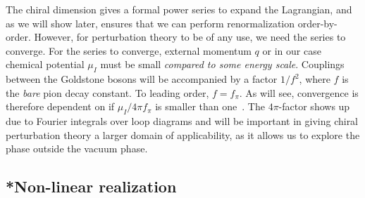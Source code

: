 The chiral dimension gives a formal power series to expand the Lagrangian, and as we will show later, ensures that we can perform renormalization order-by-order.
However, for perturbation theory to be of any use, we need the series to converge.
For the series to converge, external momentum $q$ or in our case chemical potential $\mu_I$ must be small \emph{compared to some energy scale}.
Couplings between the Goldstone bosons will be accompanied by a factor $1/f^2$, where $f$ is the \emph{bare} pion decay constant.
To leading order, $f = f_\pi$.
As will see, convergence is therefore dependent on if $\mu_I / 4 \pi f_\pi$ is smaller than one~\autocite{weinbergQuantumTheoryFields1996}.
The $4\pi$-factor shows up due to Fourier integrals over loop diagrams and will be important in giving chiral perturbation theory a larger domain of applicability, as it allows us to explore the phase outside the vacuum phase.



\subsection{*Non-linear realization}

